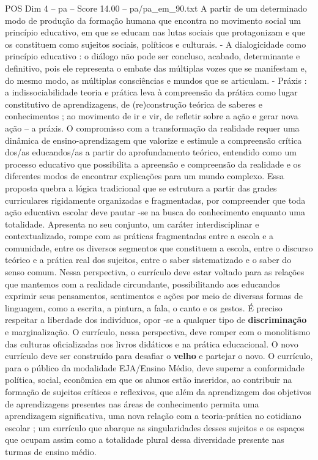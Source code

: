 \begin{textsample}{POS Dim 4 – pa – Score 14.00 – pa/pa\_em\_90.txt}
A partir de um determinado modo de produção da formação humana que encontra no movimento social um princípio educativo, em que se educam nas lutas sociais que protagonizam e que os constituem como sujeitos sociais, políticos e culturais. - A dialogicidade como princípio educativo : o diálogo não pode ser concluso, acabado, determinante e definitivo, pois ele representa o embate das múltiplas vozes que se manifestam e, do mesmo modo, as múltiplas consciências e mundos que se articulam. - Práxis : a indissociabilidade teoria e prática leva à compreensão da prática como lugar constitutivo de aprendizagens, de (re)construção teórica de saberes e conhecimentos ; ao movimento de ir e vir, de refletir sobre a ação e gerar nova ação – a práxis.
O compromisso com a transformação da realidade requer uma dinâmica de ensino-aprendizagem que valorize e estimule a compreensão crítica dos/as educandos/as a partir do aprofundamento teórico, entendido como um processo educativo que possibilita a apreensão e compreensão da realidade e os diferentes modos de encontrar explicações para um mundo complexo.
Essa proposta quebra a lógica tradicional que se estrutura a partir das grades curriculares rigidamente organizadas e fragmentadas, por compreender que toda ação educativa escolar deve pautar -se na busca do conhecimento enquanto uma totalidade.
Apresenta no seu conjunto, um caráter interdisciplinar e contextualizado, rompe com as práticas fragmentadas entre a escola e a comunidade, entre os diversos segmentos que constituem a escola, entre o discurso teórico e a prática real dos sujeitos, entre o saber sistematizado e o saber do senso comum.
Nessa perspectiva, o currículo deve estar voltado para as relações que mantemos com a realidade circundante, possibilitando aos educandos exprimir seus pensamentos, sentimentos e ações por meio de diversas formas de linguagem, como a escrita, a pintura, a fala, o canto e os gestos.
É preciso respeitar a liberdade dos indivíduos, opor -se a qualquer tipo de \textbf{discriminação} e marginalização.
O currículo, nessa perspectiva, deve romper com o monolitismo das culturas oficializadas nos livros didáticos e na prática educacional.
O novo currículo deve ser construído para desafiar o \textbf{velho} e partejar o novo.
O currículo, para o público da modalidade EJA/Ensino Médio, deve superar a conformidade política, social, econômica em que os alunos estão inseridos, ao contribuir na formação de sujeitos críticos e reflexivos, que além da aprendizagem dos objetivos de aprendizagens presentes nas áreas de conhecimento permita uma aprendizagem significativa, uma nova relação com a teoria-prática no cotidiano escolar ; um currículo que abarque as singularidades desses sujeitos e os espaços que ocupam assim como a totalidade plural dessa diversidade presente nas turmas de ensino médio.

\end{textsample}
